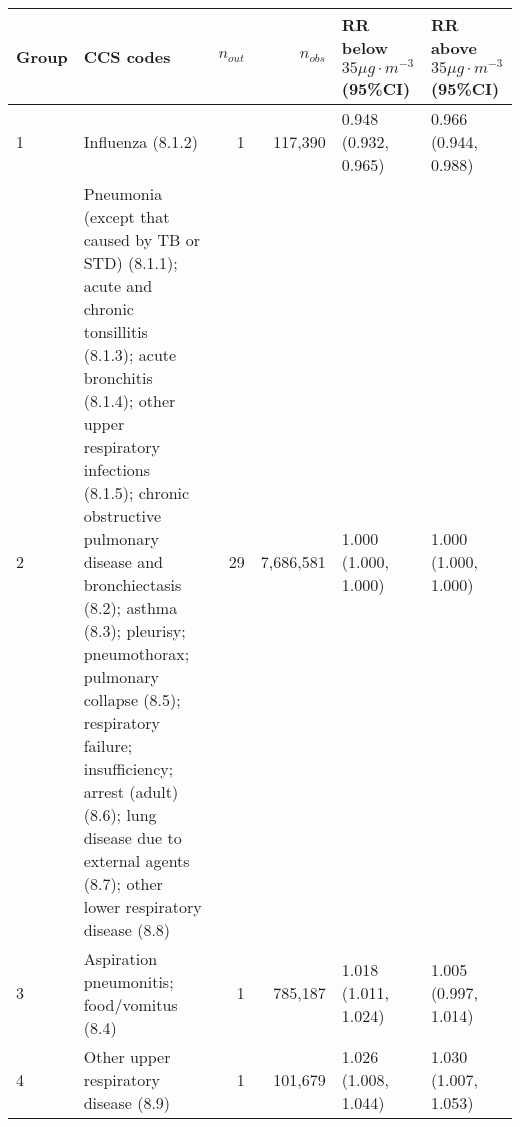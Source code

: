 \begin{tabular}{lp{6.5cm}rrp{2.2cm}p{2.2cm}}
  \hline
Group & CCS codes & $n_{out}$ & $n_{obs}$ & RR below $35 \mu g \cdot m^{-3}$ (95\%CI) & RR above $35 \mu g \cdot m^{-3}$ (95\%CI) \\ 
  \hline
   1 & Influenza (8.1.2) &    1 & 117,390 & 0.948 (0.932, 0.965) & 0.966 (0.944, 0.988) \\ 
     2 & Pneumonia (except that caused by TB or STD) (8.1.1); acute and chronic tonsillitis (8.1.3); acute bronchitis (8.1.4); other upper respiratory infections (8.1.5); chronic obstructive pulmonary disease and bronchiectasis (8.2); asthma (8.3); pleurisy; pneumothorax; pulmonary collapse (8.5); respiratory failure; insufficiency; arrest (adult) (8.6); lung disease due to external agents (8.7); other lower respiratory disease (8.8) &   29 & 7,686,581 & 1.000 (1.000, 1.000) & 1.000 (1.000, 1.000) \\ 
     3 & Aspiration pneumonitis; food/vomitus (8.4) &    1 & 785,187 & 1.018 (1.011, 1.024) & 1.005 (0.997, 1.014) \\ 
     4 & Other upper respiratory disease (8.9) &    1 & 101,679 & 1.026 (1.008, 1.044) & 1.030 (1.007, 1.053) \\ 
   \hline
\end{tabular}

